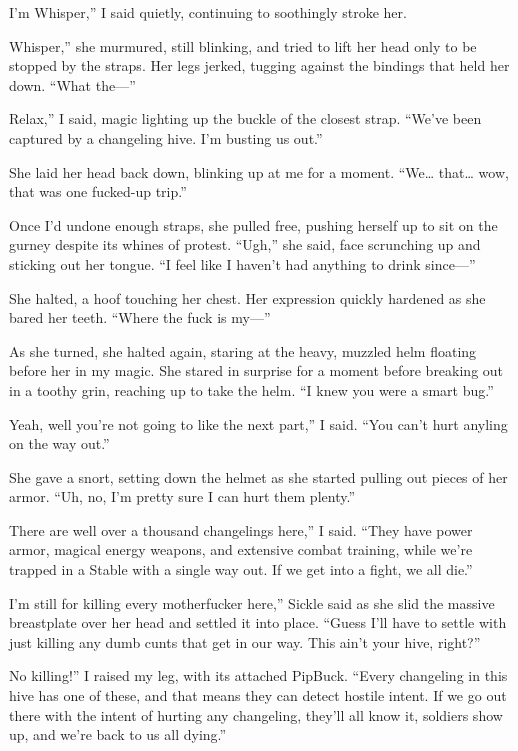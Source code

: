 \leavevmode{}I’m Whisper,” I said quietly, continuing to soothingly stroke her.

\leavevmode{}Whisper,” she murmured, still blinking, and tried to lift her head only to be stopped by the straps. Her legs jerked, tugging against the bindings that held her down. “What the—”

\leavevmode{}Relax,” I said, magic lighting up the buckle of the closest strap. “We’ve been captured by a changeling hive. I’m busting us out.”

She laid her head back down, blinking up at me for a moment. “We… that… wow, that was one fucked-up trip.”

Once I’d undone enough straps, she pulled free, pushing herself up to sit on the gurney despite its whines of protest. “Ugh,” she said, face scrunching up and sticking out her tongue. “I feel like I haven’t had anything to drink since—”

She halted, a hoof touching her chest. Her expression quickly hardened as she bared her teeth. “Where the fuck is my—”

As she turned, she halted again, staring at the heavy, muzzled helm floating before her in my magic. She stared in surprise for a moment before breaking out in a toothy grin, reaching up to take the helm. “I knew you were a smart bug.”

\leavevmode{}Yeah, well you’re not going to like the next part,” I said. “You can’t hurt anyling on the way out.”

She gave a snort, setting down the helmet as she started pulling out pieces of her armor. “Uh, no, I’m pretty sure I can hurt them plenty.”

\leavevmode{}There are well over a thousand changelings here,” I said. “They have power armor, magical energy weapons, and extensive combat training, while we’re trapped in a Stable with a single way out. If we get into a fight, we all die.”

\leavevmode{}I’m still for killing every motherfucker here,” Sickle said as she slid the massive breastplate over her head and settled it into place. “Guess I’ll have to settle with just killing any dumb cunts that get in our way. This ain’t your hive, right?”

\leavevmode{}No killing!” I raised my leg, with its attached PipBuck. “Every changeling in this hive has one of these, and that means they can detect hostile intent. If we go out there with the intent of hurting any changeling, they’ll all know it, soldiers show up, and we’re back to us all dying.”

